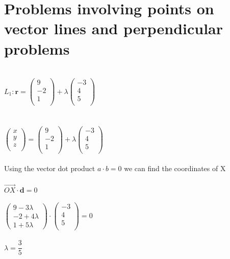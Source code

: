\documentclass{article}[18pt]
\begin{document}
\section{Problems involving points on vector lines and perpendicular problems}
\\
$L_1: \mathbf{r}=
\begin{pmatrix}
9\\
-2\\
1\\
\end{pmatrix}+\lambda
\begin{pmatrix}
-3\\
4\\
5\\
\end{pmatrix}$\\
\\
\\
$\begin{pmatrix}
x\\
y\\
z\\
\end{pmatrix}=
\begin{pmatrix}
9\\
-2\\
1\\
\end{pmatrix}+\lambda
\begin{pmatrix}
-3\\
4\\
5\\
\end{pmatrix}$
\\
\\
Using the vector dot product $a\cdot b=0$ we can find the coordinates of X\\
\\
$\overrightarrow{OX}\cdot \mathbf{d}=0$\\
\\
$\begin{pmatrix}
9-3\lambda\\
-2+4\lambda\\
1+5\lambda
\end{pmatrix}\cdot
\begin{pmatrix}
-3\\
4\\
5\\
\end{pmatrix}=0$
\\
\\
$\lambda=\dfrac{3}{5}$
\end{document}
